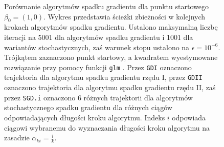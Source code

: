\begin{figure}[hbt!]
  \caption[Porównanie algorytmów spadku gradientu dla punktu startowego $\beta_0 = (1,0)$.]{\label{fig:sc3asd}Porównanie algorytmów spadku gradientu dla punktu startowego $\beta_0 = (1,0)$. Wykres przedstawia ścieżki zbieżności w kolejnych krokach algorytmów spadku gradientu. Ustalono maksymalną liczbę iteracji na 5001 dla algorytmów spadku gradientu i 1001 dla wariantów stochastycznych, zaś warunek stopu ustalono na $\epsilon=10^{-6}$. Trójkątem zaznaczono punkt startowy, a kwadratem wyestymowane rozwiązanie przy pomocy funkcji \texttt{glm} \cite{glmglm}. Przez \texttt{GDI} oznaczono trajektoria dla algorytmu spadku gradientu rzędu I, przez \texttt{GDII} oznaczono trajektoria dla algorytmu spadku gradientu rzędu II, zaś przez \texttt{SGD.i} oznaczono 6 różnych trajektorii dla algorytmów stochastycznego spadku gradientu dla różnych ciągów odpowiadających długości kroku algorytmu. Indeks $i$ odpowiada ciągowi wybranemu do wyznaczania długości kroku algorytmu na zasadzie $\alpha_{ki} = \frac{i}{k}$.}
\end{figure}


